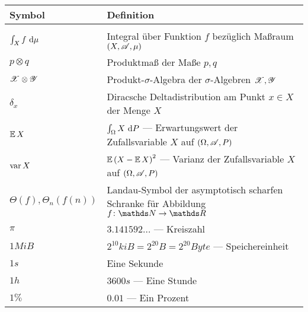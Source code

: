 \begin{table}[H]
	\begin{tabularx}{\textwidth}{p{}p{}}
		\hline
		\textbf{Symbol} & \textbf{Definition} \\
		\hline
		\hline \\



		$\int_{X}^{} f\ \mathrm{d} \mu$ & Integral über Funktion $f$ bezüglich Maßraum $(X,\mathscr{A},\mu)$ \\

		$p\otimes q$ & Produktmaß der Maße $p,q$ \\

		$\mathscr{X}\otimes\mathscr{Y}$ & Produkt-$\sigma$-Algebra der $\sigma$-Algebren $\mathscr{X},\mathscr{Y}$ \\

		$\delta_x$ & Diracsche Deltadistribution am Punkt $x\in X$ der Menge $X$ \\

		$\operatorname{\mathbb{E}} X$ & $\int_{\Omega}^{} X\ \mathrm{d} P$ --- Erwartungswert der Zufallsvariable $X$ auf $(\Omega,\mathscr{A},P)$\\

		$\operatorname{var} X$ & $\operatorname{\mathbb{E}}\left( X-\operatorname{\mathbb{E}} X \right)^2$ --- Varianz der Zufallsvariable $X$ auf $(\Omega,\mathscr{A},P)$\\

		$\Theta(f),\Theta_n(f(n))$ & Landau-Symbol der asymptotisch scharfen Schranke für Abbildung $\func{f}{\SN}{\SR}$ \\

		$\pi$ & $3.141592\ldots$ --- Kreiszahl \\

		$1\unit{MiB}$ & $2^{10}\unit{kiB} = 2^{20}\unit{B} = 2^{20}\unit{Byte}$ --- Speichereinheit \\

		$1\unit{s}$ & Eine Sekunde \\

		$1\unit{h}$ & $3600\unit{s}$ --- Eine Stunde \\

		$1\unit{\%}$ & $0.01$ --- Ein Prozent

		\\
		\hline
	\end{tabularx}
\end{table}